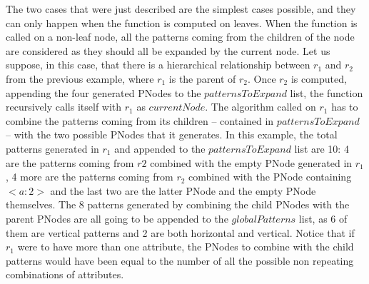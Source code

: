 \documentclass{acm_proc_article-sp-sigmod09}
\begin{document}
The two cases that were just described are the simplest cases possible, and they can only happen when the function is computed on leaves. When the function is called on a non-leaf node, all the patterns coming from the children of the node are considered as they should all be expanded by the current node. Let us suppose, in this case, that there is a hierarchical relationship between $r_1$ and $r_2$ from the previous example, where $r_1$ is the parent of $r_2$. Once $r_2$ is computed, appending the four generated PNodes to the $patternsToExpand$ list, the function recursively calls itself with $r_1$ as $currentNode$. The algorithm called on $r_1$ has to combine the patterns coming from its children -- contained in $patternsToExpand$ -- with the two possible PNodes that it generates. In this example, the total patterns generated in $r_1$ and appended to the $patternsToExpand$ list are 10: 4 are the patterns coming from $r2$ combined with the empty PNode generated in $r_1$, 4 more are the patterns coming from $r_2$ combined with the PNode containing $<a \colon 2>$ and the last two are the latter PNode and the empty PNode themselves. The 8 patterns generated by combining the child PNodes with the parent PNodes are all going to be appended to the $globalPatterns$ list, as 6 of them are vertical patterns and 2 are both horizontal and vertical. Notice that if $r_1$ were to have more than one attribute, the PNodes to combine with the child patterns would have been equal to the number of all the possible non repeating combinations of attributes.
\end{document}
